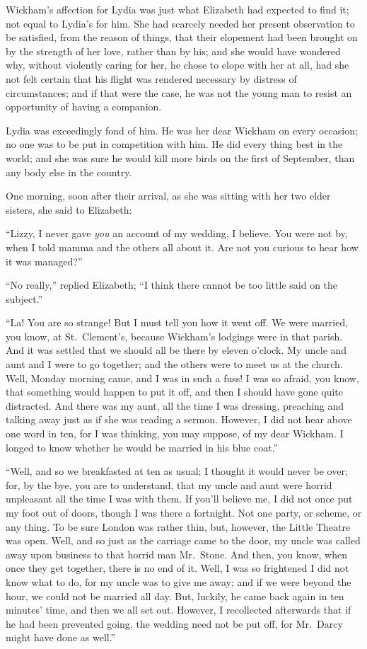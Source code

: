 \documentclass[12pt,english]{book}
\begin{document}
Wickham's affection for Lydia was just what Elizabeth had expected
to find it; not equal to Lydia's for him. She had scarcely needed
her present observation to be satisfied, from the reason of things,
that their elopement had been brought on by the strength of her love,
rather than by his; and she would have wondered why, without violently
caring for her, he chose to elope with her at all, had she not felt
certain that his flight was rendered necessary by distress of circumstances;
and if that were the case, he was not the young man to resist an opportunity
of having a companion.

Lydia was exceedingly fond of him. He was her dear Wickham on every
occasion; no one was to be put in competition with him. He did every
thing best in the world; and she was sure he would kill more birds
on the first of September, than any body else in the country.

One morning, soon after their arrival, as she was sitting with her
two elder sisters, she said to Elizabeth:

{}``Lizzy, I never gave \textit{you} an account of my wedding, I
believe. You were not by, when I told mamma and the others all about
it. Are not you curious to hear how it was managed?''\ 

{}``No really,'' replied Elizabeth; {}``I think there cannot be
too little said on the subject.''

{}``La! You are so strange! But I must tell you how it went off.
We were married, you know, at St.\ Clement's, because Wickham's lodgings
were in that parish. And it was settled that we should all be there
by eleven o'clock. My uncle and aunt and I were to go together; and
the others were to meet us at the church. Well, Monday morning came,
and I was in such a fuss! I was so afraid, you know, that something
would happen to put it off, and then I should have gone quite distracted.
And there was my aunt, all the time I was dressing, preaching and
talking away just as if she was reading a sermon. However, I did not
hear above one word in ten, for I was thinking, you may suppose, of
my dear Wickham. I longed to know whether he would be married in his
blue coat.''

{}``Well, and so we breakfasted at ten as usual; I thought it would
never be over; for, by the bye, you are to understand, that my uncle
and aunt were horrid unpleasant all the time I was with them. If you'll
believe me, I did not once put my foot out of doors, though I was
there a fortnight. Not one party, or scheme, or any thing. To be sure
London was rather thin, but, however, the Little Theatre was open.
Well, and so just as the carriage came to the door, my uncle was called
away upon business to that horrid man Mr.\ Stone. And then, you know,
when once they get together, there is no end of it. Well, I was so
frightened I did not know what to do, for my uncle was to give me
away; and if we were beyond the hour, we could not be married all
day. But, luckily, he came back again in ten minutes' time, and then
we all set out. However, I recollected afterwards that if he had been
prevented going, the wedding need not be put off, for Mr.\ Darcy
might have done as well.''
\end{document}
